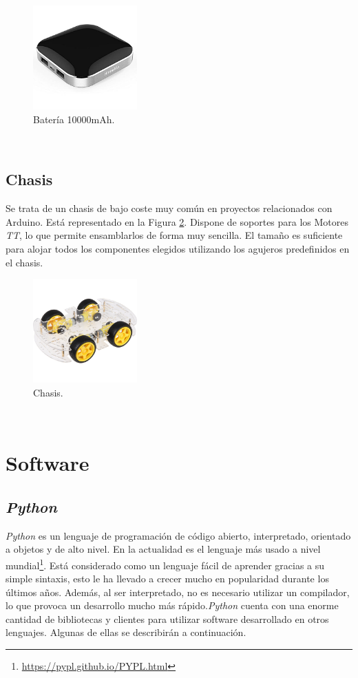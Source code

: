 \begin{figure} [h!]
	\begin{center}
		\includegraphics[width=4cm]{figs/battery}
	\end{center}
	\caption{Batería 10000mAh.}
	\label{fig:battery}
\end{figure}\

\subsection{Chasis}
\label{subsection:chasis}
Se trata de un chasis de bajo coste muy común en proyectos relacionados con Arduino. Está representado en la Figura \ref{fig:chasis}. Dispone de soportes para los Motores \textit{TT}, lo que permite ensamblarlos de forma muy sencilla. El tamaño es suficiente para alojar todos los componentes elegidos utilizando los agujeros predefinidos en el chasis.\\

\begin{figure} [h!]
	\begin{center}
		\includegraphics[width=4cm]{figs/chasis}
	\end{center}
	\caption{Chasis.}
	\label{fig:chasis}
\end{figure}\

\section{Software}

\subsection{\textit{Python}}
\label{subsection:python}
\textit{Python} es un lenguaje de programación de código abierto, interpretado, orientado a objetos y de alto nivel. En la actualidad es el lenguaje más usado a nivel mundial\footnote{\url{https://pypl.github.io/PYPL.html}}. Está considerado como un lenguaje fácil de aprender gracias a su simple sintaxis, esto le ha llevado a crecer mucho en popularidad durante los últimos años. Además, al ser interpretado, no es necesario utilizar un compilador, lo que provoca un desarrollo mucho más rápido.\textit{Python} cuenta con una enorme cantidad de bibliotecas y clientes para utilizar software desarrollado en otros lenguajes. Algunas de ellas se describirán a continuación.\\

